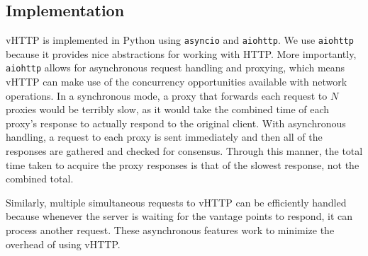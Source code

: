 

\subsection{Implementation}

vHTTP is implemented in Python using \texttt{asyncio} and \texttt{aiohttp}.
We use \texttt{aiohttp} because it provides nice abstractions for working with
HTTP. More importantly, \texttt{aiohttp} allows for asynchronous request
handling and proxying, which means vHTTP can make use of the concurrency
opportunities available with network operations. In a synchronous mode, a
proxy that forwards each request to $N$ proxies would be terribly slow, as it
would take the combined time of each proxy's response to actually respond to
the original client. With asynchronous handling, a request to each proxy is
sent immediately and then all of the responses are gathered and checked for
consensus. Through this manner, the total time taken to acquire the proxy
responses is that of the slowest response, not the combined total.

Similarly, multiple simultaneous requests to vHTTP can be efficiently handled
because whenever the server is waiting for the vantage points to respond, it
can process another request. These asynchronous features work to minimize
the overhead of using vHTTP.
